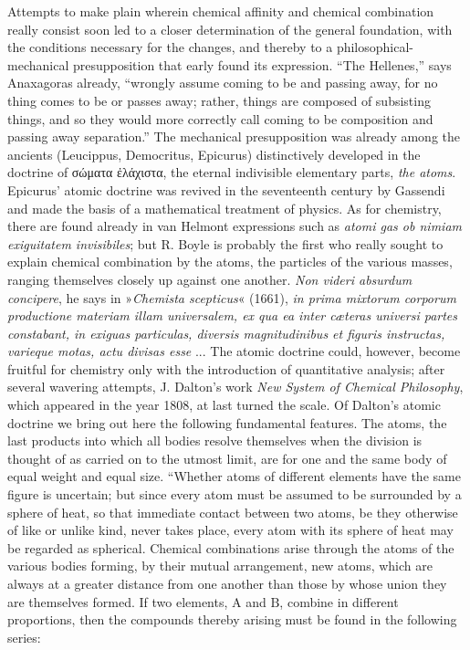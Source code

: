 \documentclass[12pt,a4paper]{book}
\begin{document}
Attempts to make plain wherein chemical affinity and chemical combination
really consist soon led to a closer determination of the general foundation,
with the conditions necessary for the changes, and thereby to a
philosophical-mechanical presupposition that early found its
expression. ``The Hellenes,'' says Anaxagoras already, ``wrongly assume coming
to be and passing away, for no thing comes to be or passes away; rather, things
are composed of subsisting things, and so they would more correctly call coming
to be composition and passing away separation.'' The mechanical presupposition
was already among the ancients (Leucippus, Democritus, Epicurus) distinctively
developed in the doctrine of σώματα ἐλάχιστα, the eternal indivisible
elementary parts, \emph{the atoms}. Epicurus' atomic doctrine was revived in
the seventeenth century by Gassendi and made the basis of a mathematical
treatment of physics. As for chemistry, there are found already in van Helmont
expressions such as \textit{atomi gas ob nimiam exiguitatem invisibiles}; but
R. Boyle is probably the first who really sought to explain chemical
combination by the atoms, the particles of the various masses, ranging
themselves closely up against one another. \textit{Non videri absurdum
concipere}, he says in »\textit{Chemista scepticus}« (1661), \textit{in prima
mixtorum corporum productione materiam illam universalem, ex qua ea inter
cæteras universi partes constabant, in exiguas particulas, diversis
magnitudinibus et figuris instructas, varieque motas, actu divisas esse} ...
The atomic doctrine could, however, become fruitful for chemistry only with the
introduction of quantitative analysis; after several wavering attempts,
J. Dalton's work \textit{New System of Chemical Philosophy}, which appeared in
the year 1808, at last turned the scale. Of Dalton's atomic doctrine we bring
out here the following fundamental features. The atoms, the last products into
which all bodies resolve themselves when the division is thought of as carried
on to the utmost limit, are for one and the same body of equal weight and equal
size. ``Whether atoms of different elements have the same figure is uncertain;
but since every atom must be assumed to be surrounded by a sphere of heat, so
that immediate contact between two atoms, be they otherwise of like or unlike
kind, never takes place, every atom with its sphere of heat may be regarded as
spherical. Chemical combinations arise
through the atoms of the various bodies forming, by their mutual arrangement,
new atoms, which are always at a greater distance from one another than those
by whose union they are themselves formed. If two elements, $\mathrm{A}$ and
$\mathrm{B}$, combine in different proportions, then the compounds thereby
arising must be found in the following series:
\end{document}
